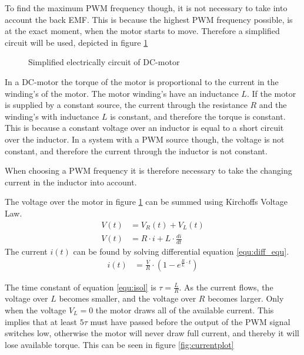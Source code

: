 \documentclass[../../../Main]{subfiles}
\begin{document}
To find the maximum PWM frequency though, it is not necessary to take into account the back EMF. This is because the highest PWM frequency possible, is at the exact moment, when the motor starts to move. Therefore a simplified circuit will be used, depicted in figure \ref{fig:electrical}

\begin{figure}[H]
	\center
    \def\svgwidth{0.4\textwidth}
	
	\caption{Simplified electrically circuit of DC-motor}
  \label{fig:electrical}
\end{figure}


In a DC-motor the torque of the motor is proportional to the current in the winding's of the motor. The motor winding's have an inductance $L$.
If the motor is supplied by a constant source, the current through the resistance $R$ and the winding's with inductance $L$ is constant, and therefore the torque is constant. This is because a constant voltage over an inductor is equal to a short circuit over the inductor.
In a system with a PWM source though, the voltage is not constant, and therefore the current through the inductor is not constant.

When choosing a PWM frequency it is therefore necessary to take the changing current in the inductor into account.

The voltage over the motor in figure \ref{fig:electrical} can be summed using Kirchoffs Voltage Law.
\begin{align}
	V(t) &= V_R(t) + V_L(t)\\
	V(t) &= R \cdot i + L \cdot \frac{di}{dt}
	\label{equ:diff_equ}
\end{align}
The current $i(t)$ can be found by solving differential equation \eqref{equ:diff_equ}.
\begin{align}
	i(t) &=\frac{V}{R} \cdot (1-e^{\frac{R}{L} \cdot t})
	\label{equ:isol}
\end{align}

The time constant of equation \eqref{equ:isol} is $\tau = \frac{L}{R}$.
As the current flows, the voltage over $L$ becomes smaller, and the voltage over $R$ becomes larger. Only when the voltage $V_L = 0$ the motor draws all of the available current.
This implies that at least $5\tau$ must have passed before the output of the PWM signal switches low, otherwise the motor will never draw full current, and thereby it will lose available torque. This can be seen in figure \ref{fig:currentplot}
\end{document}
